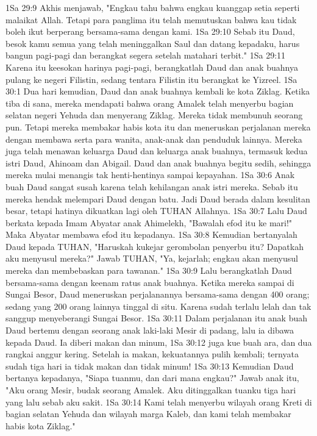 1Sa 29:9  Akhis menjawab, "Engkau tahu bahwa engkau kuanggap setia seperti malaikat Allah. Tetapi para panglima itu telah memutuskan bahwa kau tidak boleh ikut berperang bersama-sama dengan kami.
1Sa 29:10  Sebab itu Daud, besok kamu semua yang telah meninggalkan Saul dan datang kepadaku, harus bangun pagi-pagi dan berangkat segera setelah matahari terbit."
1Sa 29:11  Karena itu keesokan harinya pagi-pagi, berangkatlah Daud dan anak buahnya pulang ke negeri Filistin, sedang tentara Filistin itu berangkat ke Yizreel.
1Sa 30:1  Dua hari kemudian, Daud dan anak buahnya kembali ke kota Ziklag. Ketika tiba di sana, mereka mendapati bahwa orang Amalek telah menyerbu bagian selatan negeri Yehuda dan menyerang Ziklag. Mereka tidak membunuh seorang pun. Tetapi mereka membakar habis kota itu dan meneruskan perjalanan mereka dengan membawa serta para wanita, anak-anak dan penduduk lainnya. Mereka juga telah menawan keluarga Daud dan keluarga anak buahnya, termasuk kedua istri Daud, Ahinoam dan Abigail. Daud dan anak buahnya begitu sedih, sehingga mereka mulai menangis tak henti-hentinya sampai kepayahan.
1Sa 30:6  Anak buah Daud sangat susah karena telah kehilangan anak istri mereka. Sebab itu mereka hendak melempari Daud dengan batu. Jadi Daud berada dalam kesulitan besar, tetapi hatinya dikuatkan lagi oleh TUHAN Allahnya.
1Sa 30:7  Lalu Daud berkata kepada Imam Abyatar anak Ahimelekh, "Bawalah efod itu ke mari!" Maka Abyatar membawa efod itu kepadanya.
1Sa 30:8  Kemudian bertanyalah Daud kepada TUHAN, "Haruskah kukejar gerombolan penyerbu itu? Dapatkah aku menyusul mereka?" Jawab TUHAN, "Ya, kejarlah; engkau akan menyusul mereka dan membebaskan para tawanan."
1Sa 30:9  Lalu berangkatlah Daud bersama-sama dengan keenam ratus anak buahnya. Ketika mereka sampai di Sungai Besor, Daud meneruskan perjalanannya bersama-sama dengan 400 orang; sedang yang 200 orang lainnya tinggal di situ. Karena sudah terlalu lelah dan tak sanggup menyeberangi Sungai Besor.
1Sa 30:11  Dalam perjalanan itu anak buah Daud bertemu dengan seorang anak laki-laki Mesir di padang, lalu ia dibawa kepada Daud. Ia diberi makan dan minum,
1Sa 30:12  juga kue buah ara, dan dua rangkai anggur kering. Setelah ia makan, kekuatannya pulih kembali; ternyata sudah tiga hari ia tidak makan dan tidak minum!
1Sa 30:13  Kemudian Daud bertanya kepadanya, "Siapa tuanmu, dan dari mana engkau?" Jawab anak itu, "Aku orang Mesir, budak seorang Amalek. Aku ditinggalkan tuanku tiga hari yang lalu sebab aku sakit.
1Sa 30:14  Kami telah menyerbu wilayah orang Kreti di bagian selatan Yehuda dan wilayah marga Kaleb, dan kami telah membakar habis kota Ziklag."
